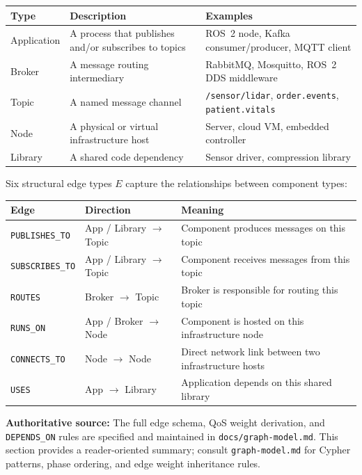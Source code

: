 \documentclass[11pt]{article}
\begin{document}
\begin{center}
\begin{tabular}{@{}lp{6.5cm}l@{}}
\toprule
\textbf{Type} & \textbf{Description} & \textbf{Examples} \\
\midrule
Application & A process that publishes and/or subscribes to topics & ROS~2 node, Kafka consumer/producer, MQTT client \\
Broker & A message routing intermediary & RabbitMQ, Mosquitto, ROS~2 DDS middleware \\
Topic & A named message channel & \texttt{/sensor/lidar}, \texttt{order.events}, \texttt{patient.vitals} \\
Node & A physical or virtual infrastructure host & Server, cloud VM, embedded controller \\
Library & A shared code dependency & Sensor driver, compression library \\
\bottomrule
\end{tabular}
\end{center}

Six structural edge types $E$ capture the relationships between component types:

\begin{center}
\begin{tabular}{@{}lll@{}}
\toprule
\textbf{Edge} & \textbf{Direction} & \textbf{Meaning} \\
\midrule
\texttt{PUBLISHES\_TO} & App / Library $\to$ Topic & Component produces messages on this topic \\
\texttt{SUBSCRIBES\_TO} & App / Library $\to$ Topic & Component receives messages from this topic \\
\texttt{ROUTES} & Broker $\to$ Topic & Broker is responsible for routing this topic \\
\texttt{RUNS\_ON} & App / Broker $\to$ Node & Component is hosted on this infrastructure node \\
\texttt{CONNECTS\_TO} & Node $\to$ Node & Direct network link between two infrastructure hosts \\
\texttt{USES} & App $\to$ Library & Application depends on this shared library \\
\bottomrule
\end{tabular}
\end{center}

\noindent\textbf{Authoritative source:} The full edge schema, QoS weight derivation, and \texttt{DEPENDS\_ON} rules are specified and maintained in \texttt{docs/graph-model.md}. This section provides a reader-oriented summary; consult \texttt{graph-model.md} for Cypher patterns, phase ordering, and edge weight inheritance rules.
\end{document}
